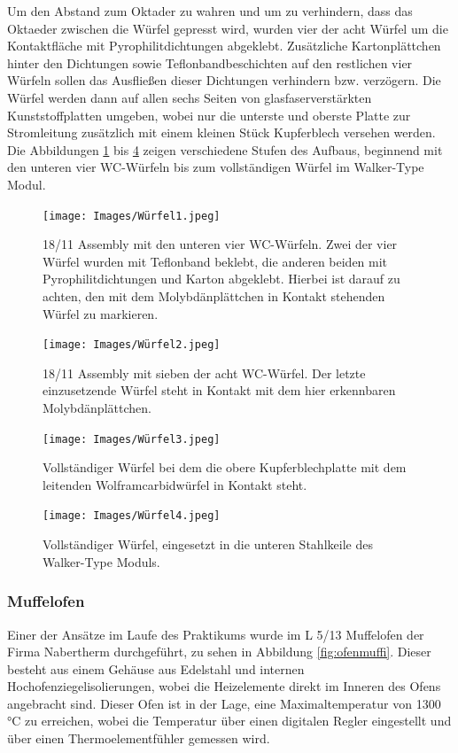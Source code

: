 \documentclass[12pt]{article}
\begin{document}
\noindent Um den Abstand zum Oktader zu wahren und um zu verhindern, dass das Oktaeder zwischen die Würfel gepresst wird, wurden vier der acht Würfel um die Kontaktfläche mit Pyrophilitdichtungen abgeklebt. Zusätzliche Kartonplättchen hinter den Dichtungen sowie Teflonbandbeschichten auf den restlichen vier Würfeln sollen das Ausfließen dieser Dichtungen verhindern bzw. verzögern.
Die Würfel werden dann auf allen sechs Seiten von glasfaserverstärkten Kunststoffplatten umgeben, wobei nur die unterste und oberste Platte zur Stromleitung zusätzlich mit einem kleinen Stück Kupferblech versehen werden.
Die Abbildungen \ref{fig:würfel1} bis \ref{fig:würfel4} zeigen verschiedene Stufen des Aufbaus, beginnend mit den unteren vier WC-Würfeln bis zum vollständigen Würfel im Walker-Type Modul.

\begin{figure}[H]
    \centering
    \texttt{[image: Images/Würfel1.jpeg]}
    \caption{18/11 Assembly mit den unteren vier WC-Würfeln. Zwei der vier Würfel wurden mit Teflonband beklebt, die anderen beiden mit Pyrophilitdichtungen und Karton abgeklebt. Hierbei ist darauf zu achten, den mit dem Molybdänplättchen in Kontakt stehenden Würfel zu markieren.}
    \label{fig:würfel1}
\end{figure}

\begin{figure}[H]
    \centering
    \texttt{[image: Images/Würfel2.jpeg]}
    \caption{18/11 Assembly mit sieben der acht WC-Würfel. Der letzte einzusetzende Würfel steht in Kontakt mit dem hier erkennbaren Molybdänplättchen.}
    \label{fig:würfel2}
\end{figure}

\begin{figure}[H]
    \centering
    \texttt{[image: Images/Würfel3.jpeg]}
    \caption{Vollständiger Würfel bei dem die obere Kupferblechplatte mit dem leitenden Wolframcarbidwürfel in Kontakt steht.}
    \label{fig:würfel3}
\end{figure}

\begin{figure}[H]
    \centering
    \texttt{[image: Images/Würfel4.jpeg]}
    \caption{Vollständiger Würfel, eingesetzt in die unteren Stahlkeile des Walker-Type Moduls.}
    \label{fig:würfel4}
\end{figure}

\subsubsection{Muffelofen}
Einer der Ansätze im Laufe des Praktikums wurde im L 5/13 Muffelofen der Firma Nabertherm durchgeführt, zu sehen in Abbildung \ref{fig:ofenmuffi}. Dieser besteht aus einem Gehäuse aus Edelstahl und internen Hochofenziegelisolierungen, wobei die Heizelemente direkt im Inneren des Ofens angebracht sind.
Dieser Ofen ist in der Lage, eine Maximaltemperatur von 1300 \si{\degreeCelsius} zu erreichen, wobei die Temperatur über einen digitalen Regler eingestellt und über einen Thermoelementfühler gemessen wird.~\cite{Nabertherm}
\end{document}
